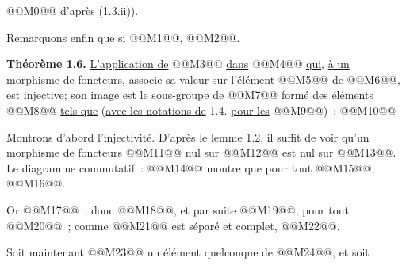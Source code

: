 
@@M0@@ d'après (1.3.ii)).

Remarquons enfin que si @@M1@@, @@M2@@.

\textbf{Théorème 1.6.} \uline{L'application de} @@M3@@ \uline{dans} @@M4@@ \uline{qui}, \uline{à un morphisme de foncteurs}, \uline{associe sa valeur sur l'élément} @@M5@@ \uline{de} @@M6@@, \uline{est injective}; \uline{son image est le sous-groupe de} @@M7@@ \uline{formé des éléments} @@M8@@ \uline{tels que} (\uline{avec les notations de} 1.4. \uline{pour les} @@M9@@)~:
@@M10@@

Montrons d'abord l'injectivité. D'après le lemme 1.2, il suffit de voir qu'un morphisme de foncteurs @@M11@@ nul sur @@M12@@ est nul sur @@M13@@. Le diagramme commutatif~:
@@M14@@
montre que pour tout @@M15@@, @@M16@@.

Or @@M17@@~; donc @@M18@@, et par suite @@M19@@, pour tout @@M20@@~; comme @@M21@@ est séparé et complet, @@M22@@.

Soit maintenant @@M23@@ un élément quelconque de @@M24@@, et soit 
